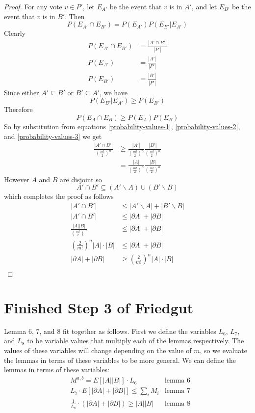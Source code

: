 \begin{proof}
		For any vote $v \in P'$, let $E_{A'}$ be the event that $v$ is in $A'$, and let $E_{B'}$ be the event that $v$ is in $B'$. Then
		\[
			P(E_{A'} \cap E_{B'}) = P(E_{A'}) P(E_{B'}|E_{A'})
		\]
		Clearly
		\begin{align}
			\label{probability-values-1}
			P(E_{A'} \cap E_{B'}) &= \frac{|A' \cap B'|}{|P'|} \\
			\label{probability-values-2}
			P(E_{A'}) &= \frac{|A'|}{|P'|} \\
			\label{probability-values-3}
			P(E_{B'}) &= \frac{|B'|}{|P'|}
		\end{align}
		Since either $A' \subseteq B'$ or $B' \subseteq A'$, we have
		\[
			P(E_{B'}|E_{A'}) \ge P(E_{B'})
		\]
		Therefore
		\[
			P(E_A \cap E_B) \ge P(E_A) P(E_B)
		\]
		So by substitution from equations \ref{probability-values-1}, \ref{probability-values-2}, and \ref{probability-values-3} we get
		\begin{align*}
			\frac{|A' \cap B'|}{(\frac{m!}{2})^n} &\ge \frac{|A'|}{(\frac{m!}{2})^n} \frac{|B'|}{(\frac{m!}{2})^n} \\
			&= \frac{|A|}{(\frac{m!}{2})^n} \frac{|B|}{(\frac{m!}{2})^n}
		\end{align*}
		However $A$ and $B$ are disjoint so
		\[
			A' \cap B' \subseteq (A' \backslash A) \cup (B' \backslash B)
		\]
		which completes the proof as follows
		\begin{align*}
			|A' \cap B'| &\le |A' \backslash A| + |B' \backslash B| \\
			|A' \cap B'| &\le |\partial A| + |\partial B| \\
			\frac{|A||B|}{(\frac{m!}{2})^n} &\le |\partial A| + |\partial B| \\
			\left(\frac{2}{m!}\right)^n |A| \cdot |B| &\le |\partial A| + |\partial B| \\
			|\partial A| + |\partial B| &\ge \left(\frac{2}{m!}\right)^n |A| \cdot |B| \\
		\end{align*}
	\end{proof}

\section{Finished Step 3 of Friedgut}

	Lemma 6, 7, and 8 fit together as follows. First we define the variables $L_6$, $L_7$, and $L_8$ to be variable values that multiply each of the lemmas respectively. The values of these variables will change depending on the value of $m$, so we evaluate the lemmas in terms of these variables to be more general. We can define the lemmas in terms of these variables:
	\begin{align*}
		&M^{a,b} = E[|A||B|] \cdot L_6 & \textrm{lemma 6} \\
		&L_7 \cdot E[|\partial A| + |\partial B|] \le \sum_i M_i & \textrm{lemma 7} \\
		&\frac{1}{L_8} \cdot (|\partial A| + |\partial B|) \ge |A||B| & \textrm{lemma 8}
	\end{align*}

